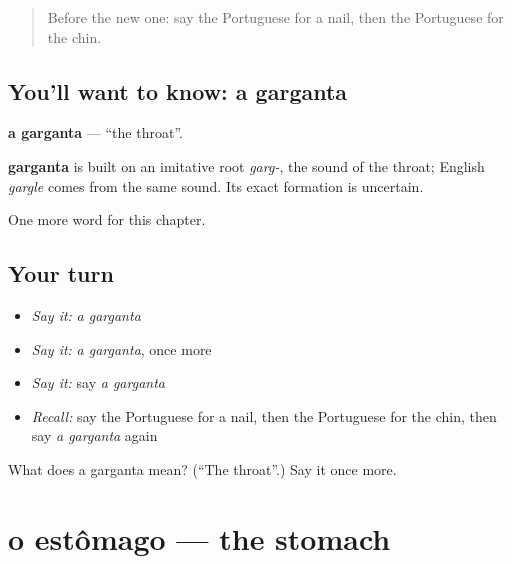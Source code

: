 \label{lesson:PT-C33-garganta}



\begin{quote}
Before the new one: say the Portuguese for a nail, then the Portuguese for the chin.
\end{quote}

\subsection*{You'll want to know: a garganta}
\textbf{a garganta} — \textquotedblleft{}the throat\textquotedblright{}.

\begin{cousinweb}
\textbf{garganta} is built on an imitative root \emph{garg-}, the sound of the throat; English \emph{gargle} comes from the same sound. Its exact formation is uncertain.
\end{cousinweb}

\begin{grammarlens}[title={What you've built}]
One more word for this chapter.
\end{grammarlens}

\subsection*{Your turn}
\begin{itemize}
\raggedright
  \item \emph{Say it:} \emph{a garganta}
  \item \emph{Say it:} \emph{a garganta}, once more
  \item \emph{Say it:} say \emph{a garganta}
  \item \emph{Recall:} say the Portuguese for a nail, then the Portuguese for the chin, then say \emph{a garganta} again
\end{itemize}

\begin{tcolorbox}[breakable,colback=teal!4,colframe=teal!35!black,title={Before you move on}]
What does a garganta mean? (\textquotedblleft{}The throat\textquotedblright{}.) Say it once more.
\end{tcolorbox}
\section[o estômago]{o estômago — the stomach}

\label{lesson:PT-C33-estomago}



